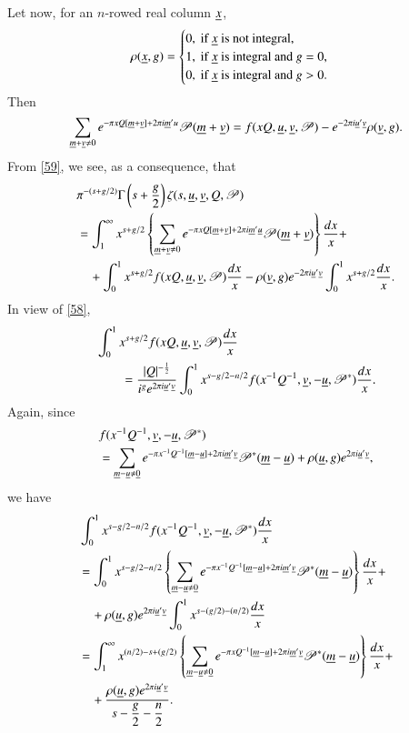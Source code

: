 Let now, for an $n$-rowed real column $\underline{x}$,
$$
\rho(\underline{x},g)=
\begin{cases}
0, \text{ if } \underline{x} \text{ is not integral,}\\
1, \text{ if } \underline{x} \text{ is integral and } g=0,\\
0, \text{ if } \underline{x} \text{ is integral and } g>0.
\end{cases}
$$
Then
$$
\sum_{\underline{m}+\underline{v}\neq 0}e^{-\pi xQ[\underline{m}+\underline{v}]+2\pi
  i\underline{m}'u}\mathscr{P}(\underline{m}+\underline{v})=f(xQ,\underline{u},\underline{v},\mathscr{P})-e^{-2\pi
  i\underline{u}'\underline{v}}\rho(\underline{v},g).
$$
From \eqref{59}, we see, as a consequence, that
\begin{align*}
& \pi^{-(s+g/2)}\Gamma
\left(s+\frac{g}{2}\right)\zeta(s,\underline{u},\underline{v},Q,\mathscr{P})\\
&= \int^{\infty}_{1}x^{s+g/2}\left\{\sum_{\underline{m}+\underline{v}\neq  0}e^{-\pi
  xQ[\underline{m}+\underline{v}]+2\pi
  i\underline{m}'\underline{u}}\mathscr{P}(\underline{m}+\underline{v})\right\}\frac{dx}{x}+\\
&\quad
+\int^{1}_{0}x^{s+g/2}f(xQ,\underline{u},\underline{v},\mathscr{P})\frac{dx}{x}-\rho(\underline{v},g)e^{-2\pi
  i\underline{u}'\underline{v}}\int^{1}_{0}x^{s+g/2}\frac{dx}{x}. 
\end{align*}\pageoriginale
In view of \eqref{58},
\begin{align*}
& \int^{1}_{0}x^{s+g/2}f(xQ,\underline{u},\underline{v},\mathscr{P})\frac{dx}{x}\\
&\qquad =\frac{|Q|^{-\frac{1}{2}}}{i^{g}e^{2\pi
      i\underline{u}'\underline{v}}}\int^{1}_{0}x^{s-g/2-n/2}f(x^{-1}Q^{-1},\underline{v},-\underline{u},\mathscr{P}^{\ast})\frac{dx}{x}. 
\end{align*}
Again, since
\begin{align*}
& f(x^{-1}Q^{-1},\underline{v},-\underline{u},\mathscr{P}^{\ast})\\
& =\sum_{\underline{m}-\underline{u}\neq \underline{0}}e^{-\pi
    x^{-1}Q^{-1}[\underline{m}-\underline{u}]+2\pi
    i\underline{m}'\underline{v}}\mathscr{P}^{\ast}(\underline{m}-\underline{u})+\rho(\underline{u},g)e^{2\pi
    i\underline{u}'\underline{v}}, 
\end{align*}
we have
\begin{align*}
& \int^{1}_{0}x^{s-g/2-n/2}f(x^{-1}Q^{-1},\underline{v},-\underline{u},\mathscr{P}^{\ast})\frac{dx}{x}\\ 
&= \int^{1}_{0}x^{s-g/2-n/2}\left\{\sum_{\underline{m}-\underline{u}\neq
  \underline{0}}e^{-\pi x^{-1}Q^{-1}[\underline{m}-\underline{u}]+2\pi
  i\underline{m}'\underline{v}}\mathscr{P}^{\ast}(\underline{m}-\underline{u})\right\}\frac{dx}{x}+\\
&\quad +\rho(\underline{u},g)e^{2\pi
  i\underline{u}'\underline{v}}\int^{1}_{0}x^{s-(g/2)-(n/2)}\frac{dx}{x}\\ 
&= \int^{\infty}_{1}x^{(n/2)-s+(g/2)}\left\{\sum_{\underline{m}-\underline{u}\neq
  \underline{0}}e^{-\pi xQ^{-1}[\underline{m}-\underline{u}]+2\pi
  i\underline{m}'\underline{v}}\mathscr{P}^{\ast}(\underline{m}-\underline{u})\right\}\frac{dx}{x}+\\
&\quad +\frac{\rho(\underline{u},g)e^{2\pi
    i\underline{u}'\underline{v}}}{s-\dfrac{g}{2}-\dfrac{n}{2}}. 
\end{align*}
